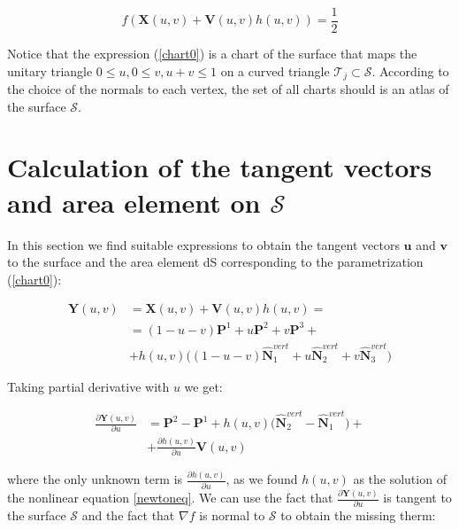 \documentclass[11pt, oneside]{article}
\newcommand\bP{\boldsymbol P}
\newcommand\bN{\boldsymbol N}
\newcommand\bX{\boldsymbol X}
\newcommand\bY{\boldsymbol Y}
\newcommand\bV{\boldsymbol V}
\newcommand\bu{\boldsymbol u}
\newcommand\bv{\boldsymbol v}
\begin{document}
\begin{equation}\label{newtoneq}
f(\bX(u,v)+\bV(u,v)h(u,v))=\frac{1}{2}
\end{equation}
 
Notice that the expression (\ref{chart0}) is a chart of the surface that maps the unitary triangle $0\le u, 0\le v, u+v\le1$ on a curved triangle $\mathcal{T}_j\subset \mathcal{S}$. According to the choice of the normals to each vertex, the set of all charts should is an atlas of the surface $\mathcal{S}$.









\section{Calculation of the tangent vectors and area element on $\mathcal{S}$}

In this section we find suitable expressions to obtain the tangent vectors $\bu$ and $\bv$ to the surface and the area element dS corresponding to the parametrization (\ref{chart0}):

\begin{equation}\label{chart}
\begin{aligned}
\bY(u,v)&=\bX(u,v)+\bV(u,v)h(u,v)=\\
&=(1-u-v)\bP^1+u\bP^2+v\bP^3+\\
&+h(u,v)\Big((1-u-v)\hat{\bN}^{vert}_1+u\hat{\bN}^{vert}_2+v\hat{\bN}^{vert}_3\Big)
\end{aligned}
\end{equation}

Taking partial derivative with $u$ we get:

\begin{equation}\label{U_vector}
\begin{aligned}
\frac{\partial\bY(u,v)}{\partial u}&=\bP^2-\bP^1+h(u,v)\Big(\hat{\bN}^{vert}_2-\hat{\bN}^{vert}_1\Big)+\\
&+\frac{\partial h(u,v)}{\partial u}\bV(u,v)
\end{aligned}
\end{equation}

where the only unknown term is $\frac{\partial h(u,v)}{\partial u}$, as we found $h(u,v)$ as the solution of the nonlinear equation \ref{newtoneq}. We can use the fact that $\frac{\partial\bY(u,v)}{\partial u}$ is tangent to the surface $\mathcal{S}$ and the fact that $\nabla f$ is normal to $\mathcal{S}$ to obtain the missing therm:
\end{document}
